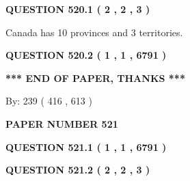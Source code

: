 \documentclass[12pt]{article}
\begin{document}
   
  
\vspace{0.2in}
  
{\textbf{\Large{QUESTION
520.1 
 ( 2 , 2 , 3 )
}}}
  
  
 
 
\noindent{}
 
 
Canada has 10  provinces and 3 territories.
 
 
 
 
  
\vspace{0.2in}
  
{\textbf{\Large{QUESTION
520.2 
 ( 1 , 1 , 6791 )
}}}
  
  
   
   
 \vspace{0.2in}
 
   
   
   
   
\vspace{1.0in} 
{\textbf{\large{ *** END OF PAPER, THANKS *** }}} 
   
   
\hspace{1.0in} By: 
 239 ( 416 ,  613 )
   
   
   
   
\newpage 
\setcounter{page}{ 
   521001 } 
   
   
   
   
 {\textbf{ \Large{ PAPER NUMBER  521  }}}
   
   
\vspace{0.2in}
   
   
   
   
   
   
 \vspace{0.2in}
 
 
 
 
   
   
  
\vspace{0.2in}
  
{\textbf{\Large{QUESTION
521.1 
 ( 1 , 1 , 6791 )
}}}
  
  
  
\vspace{0.2in}
  
{\textbf{\Large{QUESTION
521.2 
 ( 2 , 2 , 3 )
}}}
  
\end{document}
